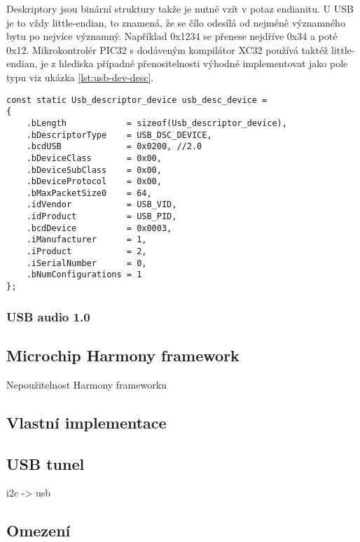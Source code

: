 Deskriptory jsou binární struktury takže je nutné vzít v potaz endianitu. U USB je to vždy little-endian, to znamená, že se čílo odesílá od nejméně významného bytu po nejvíce významný. Například 0x1234 se přenese nejdříve 0x34 a poté 0x12. Mikrokontrolér PIC32 s dodáveným kompilátor XC32 používá taktéž little-endian, je z hlediska případné přenositelnosti výhodné implementovat jako pole typu  viz ukázka \ref{lst:usb-dev-desc}.
\begin{lstlisting}[caption=Deskriptor zařízení.]
const static Usb_descriptor_device usb_desc_device =
{
    .bLength            = sizeof(Usb_descriptor_device),
    .bDescriptorType    = USB_DSC_DEVICE,
    .bcdUSB             = 0x0200, //2.0
    .bDeviceClass       = 0x00,
    .bDeviceSubClass    = 0x00,
    .bDeviceProtocol    = 0x00,
    .bMaxPacketSize0    = 64,
    .idVendor           = USB_VID,
    .idProduct          = USB_PID,
    .bcdDevice          = 0x0003,
    .iManufacturer      = 1,
    .iProduct           = 2,
    .iSerialNumber      = 0,
    .bNumConfigurations = 1
};
\end{lstlisting}
\label{lst:usb-dev-desc}






\subsubsection{USB audio 1.0}


\subsection{Microchip Harmony framework}
Nepoužitelnost Harmony frameworku\\

\subsection{Vlastní implementace}

\subsection{USB \iic tunel}
i2c -> usb\\


\subsection{Omezení}

